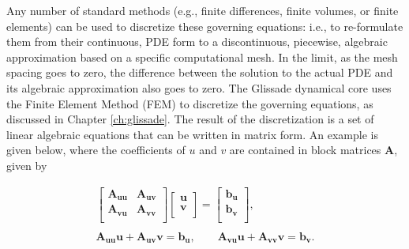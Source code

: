 %
\noindent
Any number of standard methods (e.g., finite differences, finite volumes, or finite elements) can be used to discretize these governing equations: i.e., to re-formulate them from their continuous, PDE form to a discontinuous, piecewise, algebraic approximation based on a specific computational mesh. 
In the limit, as the mesh spacing goes to zero, the difference between the solution to the actual PDE and its algebraic approximation also goes to zero. 
The Glissade dynamical core uses the Finite Element Method (FEM) to discretize the governing equations, as discussed in Chapter \ref{ch:glissade}. 
The result of the discretization is a set of linear algebraic equations that can be written in matrix form. 
An example is given below, where the coefficients of $u$ and $v$ are contained in block matrices \textbf{A}, given by 

\begin{equation}
  \begin{matrix}
    \left[ \begin{matrix}
        \mathbf{A}_{\mathbf{uu}} & \mathbf{A}_{\mathbf{uv}}  \\
        \mathbf{A}_{\mathbf{vu}} & \mathbf{A}_{\mathbf{vv}}  \\
      \end{matrix} \right]\left[ \begin{matrix}
        \mathbf{u}  \\
        \mathbf{v}  \\
      \end{matrix} \right]=\left[ \begin{matrix}
        \mathbf{b}_{\mathbf{u}}  \\
        \mathbf{b}_{\mathbf{v}}  \\
      \end{matrix} \right], \\ 
    \\ 
    \mathbf{A}_{\mathbf{uu}}\mathbf{u} + \mathbf{A}_{\mathbf{uv}}\mathbf{v} =\mathbf{b}_{\mathbf{u}},
    \quad \quad \mathbf{A}_{\mathbf{vu}}\mathbf{u} + \mathbf{A}_{\mathbf{vv}}\mathbf{v} =\mathbf{b}_{\mathbf{v}}. \\ 
  \end{matrix}
\end{equation}

